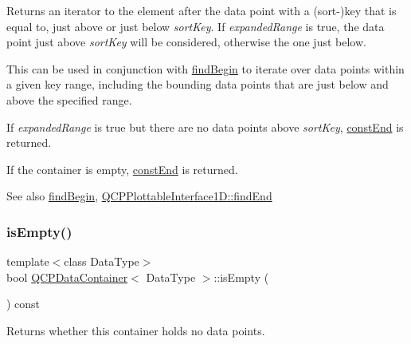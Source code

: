 Returns an iterator to the element after the data point with a (sort-\/)key that is equal to, just above or just below {\itshape sort\+Key}. If {\itshape expanded\+Range} is true, the data point just above {\itshape sort\+Key} will be considered, otherwise the one just below.

This can be used in conjunction with \hyperlink{class_q_c_p_data_container_a2ad8a5399072d99a242d3a6d2d7e278a}{find\+Begin} to iterate over data points within a given key range, including the bounding data points that are just below and above the specified range.

If {\itshape expanded\+Range} is true but there are no data points above {\itshape sort\+Key}, \hyperlink{class_q_c_p_data_container_aa7f7cf239b85b1a28de3d675cc5b3da1}{const\+End} is returned.

If the container is empty, \hyperlink{class_q_c_p_data_container_aa7f7cf239b85b1a28de3d675cc5b3da1}{const\+End} is returned.

\begin{DoxySeeAlso}{See also}
\hyperlink{class_q_c_p_data_container_a2ad8a5399072d99a242d3a6d2d7e278a}{find\+Begin}, \hyperlink{class_q_c_p_plottable_interface1_d_a5deced1016bc55a41a2339619045b295}{Q\+C\+P\+Plottable\+Interface1\+D\+::find\+End} 
\end{DoxySeeAlso}
\mbox{\label{class_q_c_p_data_container_a7bdebfccd2f9f84bf032882f9d6b00a8}} 
\subsubsection{\texorpdfstring{is\+Empty()}{isEmpty()}}
{\footnotesize\ttfamily template$<$class Data\+Type$>$ \\
bool \hyperlink{class_q_c_p_data_container}{Q\+C\+P\+Data\+Container}$<$ Data\+Type $>$\+::is\+Empty (\begin{DoxyParamCaption}{ }\end{DoxyParamCaption}) const\hspace{0.3cm}{\ttfamily [inline]}}

Returns whether this container holds no data points. \mbox{\label{class_q_c_p_data_container_aba6e1a93c21ccc56a432b4a02c9d0ed2}} 
